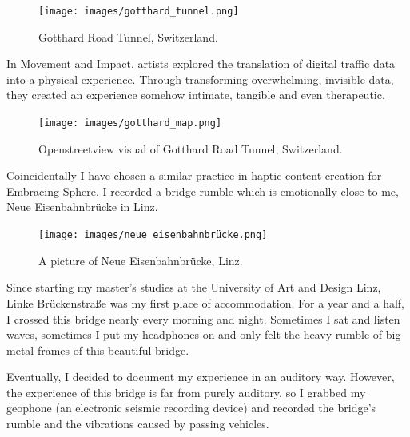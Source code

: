                 \begin{figure}[H]
                    \centering
                    \texttt{[image: images/gotthard\_tunnel.png]}
                    \caption{Gotthard Road Tunnel, Switzerland.}
                    \label{fig:GOTTHARD}
                \end{figure}  

                In Movement and Impact, artists explored the translation of digital traffic data into a physical experience. Through transforming overwhelming, invisible data, they created an experience somehow intimate, tangible and even therapeutic.\par

                \begin{figure}[H]
                    \centering
                    \texttt{[image: images/gotthard\_map.png]}
                    \caption{Openstreetview visual of Gotthard Road Tunnel, Switzerland.}
                    \label{fig:GOTTHARD_02}
                \end{figure}  

                Coincidentally I have chosen a similar practice in haptic content creation for Embracing Sphere. I recorded a bridge rumble which is emotionally close to me, Neue Eisenbahnbrücke in Linz.\par

                \begin{figure}[H]
                    \centering
                    \texttt{[image: images/neue\_eisenbahnbrücke.png]}
                    \caption{A picture of Neue Eisenbahnbrücke, Linz.}
                    \label{fig:BRUCKELINZ}
                \end{figure}

                Since starting my master's studies at the University of Art and Design Linz, Linke Brückenstraße was my first place of accommodation. For a year and a half, I crossed this bridge nearly every morning and night. Sometimes I sat and listen waves, sometimes I put my headphones on and only felt the heavy rumble of big metal frames of this beautiful bridge.\par

                Eventually, I decided to document my experience in an auditory way. However, the experience of this bridge is far from purely auditory, so I grabbed my geophone (an electronic seismic recording device) and recorded the bridge’s rumble and the vibrations caused by passing vehicles.\par

